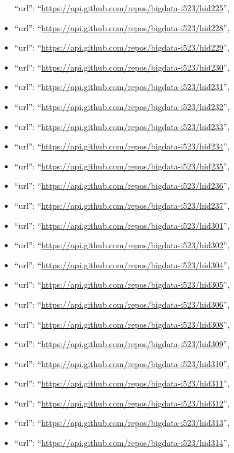\begin{itemize}
  ``url'': ``\url{https://api.github.com/repos/bigdata-i523/hid225}'',
\item
  ``url'': ``\url{https://api.github.com/repos/bigdata-i523/hid228}'',
\item
  ``url'': ``\url{https://api.github.com/repos/bigdata-i523/hid229}'',
\item
  ``url'': ``\url{https://api.github.com/repos/bigdata-i523/hid230}'',
\item
  ``url'': ``\url{https://api.github.com/repos/bigdata-i523/hid231}'',
\item
  ``url'': ``\url{https://api.github.com/repos/bigdata-i523/hid232}'',
\item
  ``url'': ``\url{https://api.github.com/repos/bigdata-i523/hid233}'',
\item
  ``url'': ``\url{https://api.github.com/repos/bigdata-i523/hid234}'',
\item
  ``url'': ``\url{https://api.github.com/repos/bigdata-i523/hid235}'',
\item
  ``url'': ``\url{https://api.github.com/repos/bigdata-i523/hid236}'',
\item
  ``url'': ``\url{https://api.github.com/repos/bigdata-i523/hid237}'',
\item
  ``url'': ``\url{https://api.github.com/repos/bigdata-i523/hid301}'',
\item
  ``url'': ``\url{https://api.github.com/repos/bigdata-i523/hid302}'',
\item
  ``url'': ``\url{https://api.github.com/repos/bigdata-i523/hid304}'',
\item
  ``url'': ``\url{https://api.github.com/repos/bigdata-i523/hid305}'',
\item
  ``url'': ``\url{https://api.github.com/repos/bigdata-i523/hid306}'',
\item
  ``url'': ``\url{https://api.github.com/repos/bigdata-i523/hid308}'',
\item
  ``url'': ``\url{https://api.github.com/repos/bigdata-i523/hid309}'',
\item
  ``url'': ``\url{https://api.github.com/repos/bigdata-i523/hid310}'',
\item
  ``url'': ``\url{https://api.github.com/repos/bigdata-i523/hid311}'',
\item
  ``url'': ``\url{https://api.github.com/repos/bigdata-i523/hid312}'',
\item
  ``url'': ``\url{https://api.github.com/repos/bigdata-i523/hid313}'',
\item
  ``url'': ``\url{https://api.github.com/repos/bigdata-i523/hid314}'',

\end{itemize}
